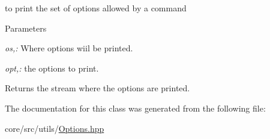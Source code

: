 to print the set of options allowed by a command 


\begin{DoxyParams}{Parameters}
\item[{\em os,:}]Where options wiil be printed. \item[{\em opt,:}]the options to print. \end{DoxyParams}
\begin{DoxyReturn}{Returns}
the stream where the options are printed. 
\end{DoxyReturn}


The documentation for this class was generated from the following file:\begin{DoxyCompactItemize}
\item 
core/src/utils/\hyperlink{Options_8hpp}{Options.hpp}\end{DoxyCompactItemize}
